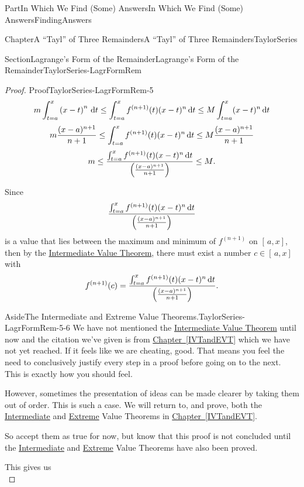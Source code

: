 \documentclass[oneside,10pt,]{book}
\newcommand{\xreffont}{\relax}
\numberwithin{equation}{part}
\newcommand{\dx}[1]{\,{\rm d}#1}
\begin{document}
\begin{partptx}{Part}{In Which We Find (Some) Answers}{}{In Which We Find (Some) Answers}{}{}{FindingAnswers}
\begin{chapterptx}{Chapter}{A ``Tayl'' of Three Remainders}{}{A ``Tayl'' of Three Remainders}{}{}{TaylorSeries}
\begin{sectionptx}{Section}{Lagrange's Form of the Remainder}{}{Lagrange's Form of the Remainder}{}{}{TaylorSeries-LagrFormRem}
\begin{proof}{Proof}{}{TaylorSeries-LagrFormRem-5}
\begin{equation*}
m\int_{t=a}^x\left(x-t\right)^n\dx{ t}\leq\int_{t=a}^xf^{(n+1)}(t)(x-t)^n\dx{ t}\leq M\int_{t=a}^x(x-t)^n\dx{ t}
\end{equation*}
%
\begin{equation}
m\frac{(x-a)^{n+1}}{n+1}\leq\int_{t=a}^xf^{(n+1)}(t)(x-t)^n\dx{ t}\leq M\frac{(x-a)^{n+1}}{n+1}\label{eq_LagRem3}
\end{equation}
%
\begin{equation*}
m\leq\frac{\int_{t=a}^xf^{(n+1)}(t)(x-t)^n\dx{ t}}{\left(\frac{(x-a)^{n+1}}{n+1} \right)}\leq M\text{.}
\end{equation*}
%
\par
Since%
\begin{equation*}
\frac{\int_{t=a}^xf^{(n+1)}(t)(x-t)^n\dx{ t}}{\left(\frac{(x-a)^{n+1}}{n+1} \right)}
\end{equation*}
is a value that lies between the maximum and minimum of \(f^{(n+1)}\) on \([\,a,x]\), then by the \hyperref[IntermediateValueTheorem]{Intermediate Value Theorem}, there must exist a number \(c\in[\,a,x]\) with%
\begin{equation*}
f^{(n+1)}(c)=\frac{\int_{t=a}^xf^{(n+1)}(t)(x-t)^n\dx{ t}}{\left( \frac{(x-a)^{n+1}}{n+1}\right)}\text{.}
\end{equation*}
%
\begin{aside}{Aside}{The Intermediate and Extreme Value Theorems.}{TaylorSeries-LagrFormRem-5-6}%
We have not mentioned the \hyperref[IntermediateValueTheorem]{Intermediate Value Theorem} until now and the citation we've given is from \hyperref[IVTandEVT]{Chapter~{\xreffont\ref{IVTandEVT}}} which we have not yet reached. If it feels like we are cheating, good. That means you feel the need to conclusively justify every step in a proof before going on to the next. This is exactly how you should feel.%
\par
However, sometimes the presentation of ideas can be made clearer by taking them out of order. This is such a case. We will return to, and prove, both the \hyperref[IntermediateValueTheorem]{Intermediate} and \hyperref[thm_EVT]{Extreme} Value Theorems in \hyperref[IVTandEVT]{Chapter~{\xreffont\ref{IVTandEVT}}}.%
\par
So accept them as true for now, but know that this proof is not concluded until the \hyperref[IntermediateValueTheorem]{Intermediate} and  \hyperref[thm_EVT]{Extreme} Value Theorems have also been proved.%
\end{aside}
This gives us%
\begin{equation*}

\end{equation*}
\end{proof}
\end{sectionptx}
\end{chapterptx}
\end{partptx}
\end{document}
